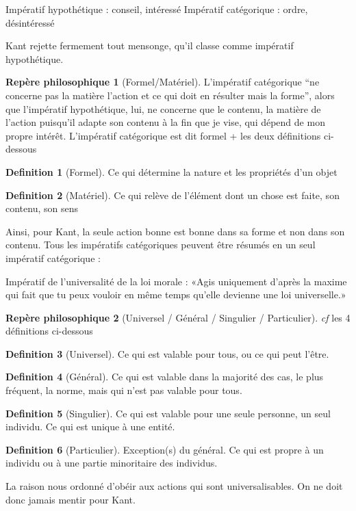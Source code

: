 \documentclass[french]{book}
\theoremstyle{definition}
\newtheorem*{dfn}{Definition}
\newtheorem*{rep}{Repère philosophique}
\begin{document}
Impératif hypothétique : conseil, intéressé
Impératif catégorique : ordre, désintéressé

Kant rejette fermement tout mensonge, qu'il classe comme impératif hypothétique.

\begin{rep}[Formel/Matériel]
L’impératif catégorique “ne concerne pas la matière l’action et ce qui doit en résulter mais la forme”, alors que l’impératif hypothétique, lui, ne concerne que le contenu, la matière de l’action puisqu’il adapte son contenu à la fin que je vise, qui dépend de mon propre intérêt. L’impératif catégorique est dit formel + les deux définitions ci-dessous
\end{rep}
\begin{dfn}[Formel]
Ce qui détermine la nature et les propriétés d’un objet
\end{dfn}
\begin{dfn}[Matériel]
Ce qui relève de l’élément dont un chose est faite, son contenu, son sens
\end{dfn}


Ainsi, pour Kant, la seule action bonne est bonne dans sa forme et non dans son contenu.
Tous les impératifs catégoriques peuvent être résumés en un seul impératif catégorique :

Impératif de l'universalité de la loi morale :
«Agis uniquement d'après la maxime qui fait que tu peux vouloir en même temps qu'elle devienne une loi universelle.»

\begin{rep}[Universel / Général / Singulier / Particulier]
	\textit{cf} les 4 définitions ci-dessous
\end{rep}
\begin{dfn}[Universel]
Ce qui est valable pour tous, ou ce qui peut l’être.
\end{dfn}
\begin{dfn}[Général]
Ce qui est valable dans la majorité des cas, le plus fréquent, la norme, mais qui n’est pas valable pour tous.
\end{dfn}
\begin{dfn}[Singulier]
Ce qui est valable pour une seule personne, un seul individu. Ce qui est unique à une entité.
\end{dfn}
\begin{dfn}[Particulier]
Exception(s) du général. Ce qui est propre à un individu ou à une partie minoritaire des individus.
\end{dfn}


La raison nous ordonné d'obéir aux actions qui sont universalisables. On ne doit donc jamais mentir pour Kant.
\end{document}
